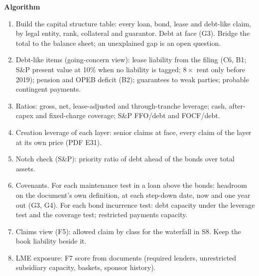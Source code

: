 \documentclass[11pt]{article}
\newcommand{\fld}[1]{\par\medskip\noindent\textbf{\textcolor{steel}{#1}}\par\nopagebreak}
\begin{document}
\fld{Algorithm}
\begin{algobox}
\begin{enumerate}
\item Build the capital structure table: every loan, bond, lease and debt-like claim, by legal entity, rank, collateral and guarantor. Debt at face (G3). Bridge the total to the balance sheet; an unexplained gap is an open question.
\item Debt-like items (going-concern view): lease liability from the filing (C6, B1; S\&P present value at 10\% when no liability is tagged; $8\times$ rent only before 2019); pension and OPEB deficit (B2); guarantees to weak parties; probable contingent payments.
\item Ratios: gross, net, lease-adjusted and through-tranche leverage; cash, after-capex and fixed-charge coverage; S\&P FFO/debt and FOCF/debt.
\item Creation leverage of each layer: senior claims at face, every claim of the layer at its own price (PDF E31).
\item Notch check (S\&P): priority ratio of debt ahead of the bonds over total assets.
\item Covenants. For each maintenance test in a loan above the bonds: headroom on the document's own definition, at each step-down date, now and one year out (G3, G4). For each bond incurrence test: debt capacity under the leverage test and the coverage test; restricted payments capacity.
\item Claims view (F5): allowed claim by class for the waterfall in S8. Keep the book liability beside it.
\item LME exposure: F7 score from documents (required lenders, unrestricted subsidiary capacity, baskets, sponsor history).
\end{enumerate}
\end{algobox}
\end{document}
